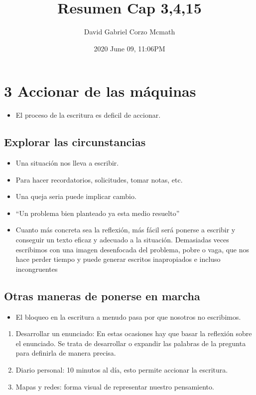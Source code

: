 \documentclass[openany]{book}
\title{Resumen Cap 3,4,15}
\date{2020 June 09, 11:06PM}
\author{David Gabriel Corzo Mcmath}
\begin{document}
\maketitle
\chapter{3 Accionar de las máquinas}
\begin{itemize}
    \item El proceso de la escritura es deficil de accionar. 
\end{itemize}
\section{Explorar las circunstancias}
\begin{itemize}
    \item Una situación nos lleva a escribir. 
    \item Para hacer recordatorios, solicitudes, tomar notas, etc. 
    \item Una queja seria puede implicar cambio. 
    \item ``Un problema bien planteado ya esta medio resuelto''
    \item Cuanto más concreta sea la reflexión, más fácil será ponerse a escribir y conseguir un texto eficaz y adecuado a la situación. Demasiadas veces escribimos con una imagen desenfocada del problema, pobre o vaga, que nos hace perder tiempo y puede generar escritos inapropiados e incluso incongruentes
\end{itemize}
\section{Otras maneras de ponerse en marcha}
\begin{itemize}
    \item El bloqueo en la escritura a menudo pasa por que nosotros no escribimos. 
\end{itemize}
\begin{enumerate}
    \item Desarrollar un enunciado: En estas ocasiones hay que basar la reflexión sobre el enunciado. Se trata de desarrollar o expandir las palabras de la pregunta para definirla de manera precisa. 
    \item Diario personal: 10 minutos al día, esto permite accionar la escritura. 
    \item Mapas y redes: forma visual de representar nuestro pensamiento. 
\end{enumerate}
\end{document}
